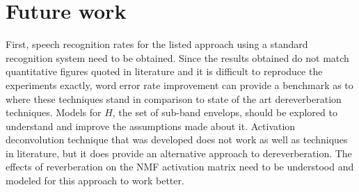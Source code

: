 \section{Future work}
First, speech recognition rates for the listed approach using a standard recognition system need to be obtained. Since the results obtained do not match quantitative figures quoted in literature and it is difficult to reproduce the experiments exactly, word error rate improvement can provide a benchmark as to where these techniques stand in comparison to state of the art dereverberation techniques. Models for $H$, the set of sub-band envelops, should be explored to understand and improve the assumptions made about it. 
Activation deconvolution technique that was developed does not work as well as techniques in literature, but it does provide an alternative approach to dereverberation. The effects of reverberation on the NMF activation matrix need to be understood and modeled  for this approach to work better.





